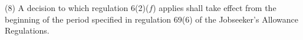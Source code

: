 \documentclass[12pt,a4paper]{article}
\begin{document}
%

%
%

(8) A decision to which regulation 6(2)($f$) applies shall take effect from the beginning of the period specified in regulation 69(6) of the Jobseeker’s Allowance Regulations.


\end{document}
